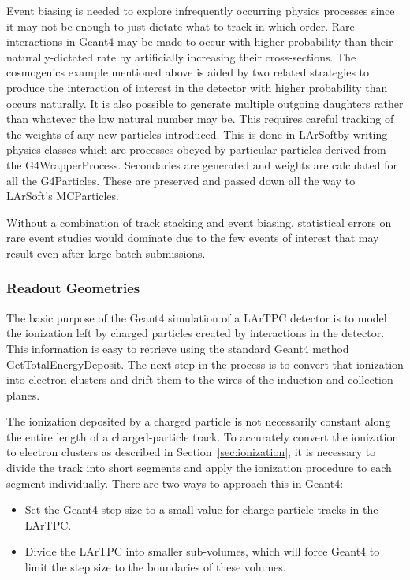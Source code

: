 \documentclass[12pt]{elsarticle}
\newcommand{\larsoft}{LArSoft}
\begin{document}
Event biasing is needed to explore infrequently occurring physics processes since it may
not be enough to just dictate what to track in which order. Rare interactions in Geant4 may be made to occur with higher 
probability than their naturally-dictated rate by artificially increasing their cross-sections. The cosmogenics example mentioned above is 
aided by two related strategies to produce the interaction of interest in the detector
with higher probability than occurs naturally. It is also possible to generate multiple outgoing daughters rather than whatever the low natural
number may be. This requires careful tracking of the weights of any new 
particles introduced. This is done in \larsoft by writing physics classes which are processes obeyed by particular particles derived from the G4WrapperProcess. Secondaries are generated 
and weights are calculated for all the G4Particles. These are preserved and passed down all the way to \larsoft's MCParticles.

Without a combination of track stacking and event biasing, statistical errors on rare event studies would dominate due to the few events of interest that may result even after large batch submissions.

\subsubsection{Readout Geometries}
\label{sec:detsim}

The basic purpose of the Geant4 simulation of a LArTPC detector is to
model the ionization left by charged particles created by interactions
in the detector. This information is easy to retrieve using the
standard Geant4 method GetTotalEnergyDeposit. The next
step in the process is to convert that ionization into electron
clusters and drift them to the wires of the induction and collection
planes. 

The ionization deposited by a charged particle is not necessarily
constant along the entire length of a charged-particle track. To
accurately convert the ionization to electron clusters as described in
Section~\ref{sec:ionization}, it is necessary to divide the track into
short segments and apply the ionization procedure to each segment
individually. There are two ways to approach this in Geant4:

\begin{itemize}
\item Set the Geant4 step size to a small value for charge-particle tracks in the LArTPC.
\item Divide the LArTPC into smaller sub-volumes, which will force Geant4 to limit the step size to the boundaries of these volumes.
\end{itemize}
\end{document}
